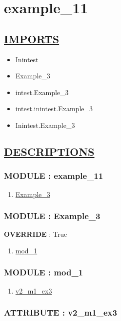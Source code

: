 \chapter*{example\_11}

\section*{\underline{IMPORTS}}
\begin{itemize}
\item Inintest
\item Example\_3
\item intest.Example\_3
\item intest.inintest.Example\_3
\item Inintest.Example\_3
\end{itemize}

\section*{\underline{DESCRIPTIONS}}
\subsection*{MODULE : example\_11}
\hypertarget{ecldoc:example_11_example_11}{}
\begin{enumerate}
\item \hyperlink{ecldoc:example_11_Inintest.Example_3}{Example\_3}
\end{enumerate}
\subsection*{MODULE : Example\_3}
\hypertarget{ecldoc:example_11_Inintest.Example_3}{}
\textbf{OVERRIDE} : True \\
\begin{enumerate}
\item \hyperlink{ecldoc:example_11_Inintest.Example_3.mod_1}{mod\_1}
\end{enumerate}
\subsection*{MODULE : mod\_1}
\hypertarget{ecldoc:example_11_Inintest.Example_3.mod_1}{}
\begin{enumerate}
\item \hyperlink{ecldoc:example_11_inintest.example_3.mod_1.v2_m1_ex3}{v2\_m1\_ex3}
\end{enumerate}
\subsection*{ATTRIBUTE : v2\_m1\_ex3}
\hypertarget{ecldoc:example_11_inintest.example_3.mod_1.v2_m1_ex3}{}



